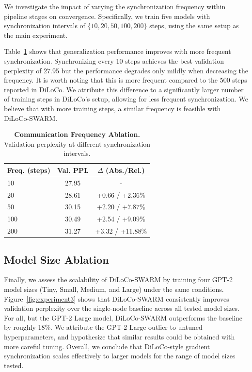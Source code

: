 \documentclass{article}
\begin{document}
We investigate the impact of varying the synchronization frequency within pipeline stages on convergence. Specifically, we train five models with synchronization intervals of $\{10, 20, 50, 100, 200\}$ steps, using the same setup as the main experiment.

Table~\ref{tab:experiment2} shows that generalization performance improves with more frequent synchronization. Synchronizing every 10 steps achieves the best validation perplexity of 27.95 but the performance degrades only mildly when decreasing the frequency. It is worth noting that this is more frequent compared to the 500 steps reported in DiLoCo. We attribute this difference to a significantly larger number of training steps in DiLoCo's setup, allowing for less frequent synchronization. We believe that with more training steps, a similar frequency is feasible with DiLoCo-SWARM.

\begin{table}[ht]
\centering
\begin{tabular}{lcc}
\toprule
\textbf{Freq. (steps)} & \textbf{Val. PPL} & \textbf{$\Delta$ (Abs./Rel.)} \\ 
\midrule
10 & 27.95 & - \\
20 & 28.61 & +0.66 / +2.36\% \\
50 & 30.15 & +2.20 / +7.87\% \\
100 & 30.49 & +2.54 / +9.09\% \\
200 & 31.27 & +3.32 / +11.88\% \\
\bottomrule
\end{tabular}
\caption{\textbf{Communication Frequency Ablation.} Validation perplexity at different synchronization intervals.}
\label{tab:experiment2}
\end{table}

\subsection{Model Size Ablation}

Finally, we assess the scalability of DiLoCo-SWARM by training four GPT-2 model sizes (Tiny, Small, Medium, and Large) under the same conditions. Figure~\ref{fig:experiment3} shows that DiLoCo-SWARM consistently improves validation perplexity over the single-node baseline across all tested model sizes. For all, but the GPT-2 Large model, DiLoCo-SWARM outperforms the baseline by roughly 18\%. We attribute the GPT-2 Large outlier to untuned hyperparameters, and hypothesize that similar results could be obtained with more careful tuning. Overall, we conclude that DiLoCo-style gradient synchronization scales effectively to larger models for the range of model sizes tested.
\end{document}
